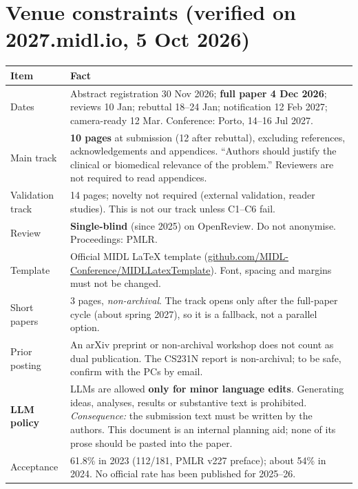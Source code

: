 \documentclass[10pt,a4paper]{article}
\begin{document}
\section{Venue constraints (verified on 2027.midl.io, 5 Oct 2026)}
\label{sec:venue}
\begin{center}
\begin{tabularx}{\linewidth}{@{}l L@{}}
\toprule
Item & Fact \cite{midl2027cfp}\\
\midrule
Dates & Abstract registration 30 Nov 2026; \textbf{full paper 4 Dec 2026}; reviews 10 Jan; rebuttal 18--24 Jan; notification 12 Feb 2027; camera-ready 12 Mar. Conference: Porto, 14--16 Jul 2027.\\
Main track & \textbf{10 pages} at submission (12 after rebuttal), excluding references, acknowledgements and appendices. ``Authors should justify the clinical or biomedical relevance of the problem.'' Reviewers are not required to read appendices.\\
Validation track & 14 pages; novelty not required (external validation, reader studies). This is not our track unless C1--C6 fail.\\
Review & \textbf{Single-blind} (since 2025) on OpenReview. Do not anonymise. Proceedings: PMLR.\\
Template & Official MIDL \LaTeX{} template (\url{github.com/MIDL-Conference/MIDLLatexTemplate}). Font, spacing and margins must not be changed.\\
Short papers & 3 pages, \emph{non-archival}. The track opens only after the full-paper cycle (about spring 2027), so it is a fallback, not a parallel option.\\
Prior posting & An arXiv preprint or non-archival workshop does not count as dual publication. The CS231N report is non-archival; to be safe, confirm with the PCs by email.\\
\textbf{LLM policy} & LLMs are allowed \textbf{only for minor language edits}. Generating ideas, analyses, results or substantive text is prohibited. \emph{Consequence:} the submission text must be written by the authors. This document is an internal planning aid; none of its prose should be pasted into the paper.\\
Acceptance & 61.8\% in 2023 (112/181, PMLR v227 preface); about 54\% in 2024. No official rate has been published for 2025--26.\\
\bottomrule
\end{tabularx}
\end{center}
\end{document}
